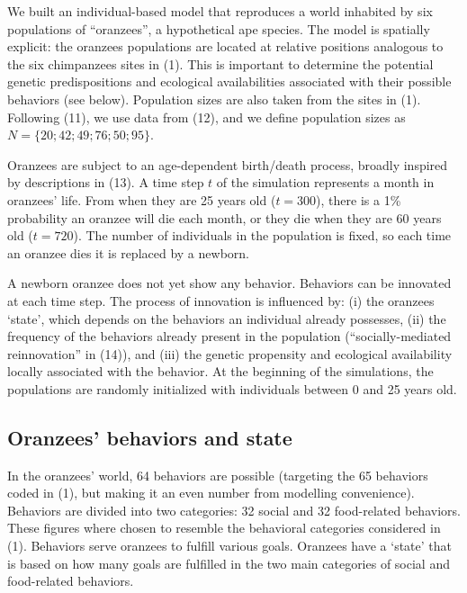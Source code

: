 \documentclass[9pt,twocolumn,twoside,]{pnas-new}
\begin{document}
We built an individual-based model that reproduces a world inhabited by
six populations of ``oranzees'', a hypothetical ape species. The model
is spatially explicit: the oranzees populations are located at relative
positions analogous to the six chimpanzees sites in (1). This is
important to determine the potential genetic predispositions and
ecological availabilities associated with their possible behaviors (see
below). Population sizes are also taken from the sites in (1). Following
(11), we use data from (12), and we define population sizes as
\(N=\{20;42;49;76;50;95\}\).

Oranzees are subject to an age-dependent birth/death process, broadly
inspired by descriptions in (13). A time step \(t\) of the simulation
represents a month in oranzees' life. From when they are 25 years old
(\(t=300\)), there is a 1\% probability an oranzee will die each month,
or they die when they are 60 years old (\(t=720\)). The number of
individuals in the population is fixed, so each time an oranzee dies it
is replaced by a newborn.

A newborn oranzee does not yet show any behavior. Behaviors can be
innovated at each time step. The process of innovation is influenced by:
(i) the oranzees `state', which depends on the behaviors an individual
already possesses, (ii) the frequency of the behaviors already present
in the population (``socially-mediated reinnovation'' in (14)), and
(iii) the genetic propensity and ecological availability locally
associated with the behavior. At the beginning of the simulations, the
populations are randomly initialized with individuals between 0 and 25
years old.

\hypertarget{format}{%
\subsection*{Oranzees' behaviors and state}\label{format}}

In the oranzees' world, 64 behaviors are possible (targeting the 65
behaviors coded in (1), but making it an even number from modelling
convenience). Behaviors are divided into two categories: 32 social and
32 food-related behaviors. These figures where chosen to resemble the
behavioral categories considered in (1). Behaviors serve oranzees to
fulfill various goals. Oranzees have a `state' that is based on how many
goals are fulfilled in the two main categories of social and
food-related behaviors.
\end{document}

